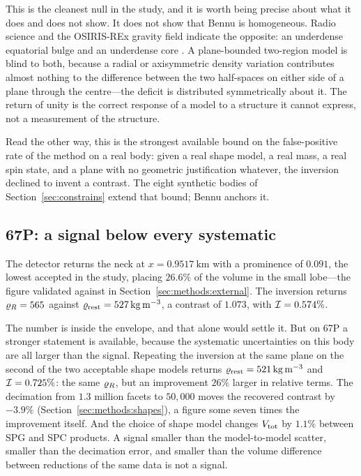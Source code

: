 This is the cleanest null in the study, and it is worth being precise
about what it does and does not show. It does not show that Bennu is
homogeneous. Radio science and the OSIRIS-REx gravity field indicate the
opposite: an underdense equatorial bulge and an underdense core
\citep{scheeres2020}. A plane-bounded two-region model is blind to both,
because a radial or axisymmetric density variation contributes almost
nothing to the difference between the two half-spaces on either side of a
plane through the centre---the deficit is distributed symmetrically about
it. The return of unity is the correct response of a model to a structure
it cannot express, not a measurement of the structure.

Read the other way, this is the strongest available bound on the
false-positive rate of the method on a real body: given a real shape
model, a real mass, a real spin state, and a plane with no geometric
justification whatever, the inversion declined to invent a contrast. The
eight synthetic bodies of Section~\ref{sec:constrains} extend that bound;
Bennu anchors it.

\subsection{67P: a signal below every systematic}
\label{sec:nulls:67p}

The detector returns the neck at $x = \SI{+0.9517}{\kilo\metre}$ with a
prominence of $0.091$, the lowest accepted in the study, placing $26.6\%$
of the volume in the small lobe---the figure validated against
\citet{jorda2016} in Section~\ref{sec:methods:external}. The inversion
returns $\varrho_{R} = 565$ against $\varrho_{\mathrm{rest}} = \SI{527}{\kilo\gram\per
\cubic\metre}$, a contrast of $1.073$, with $\mathcal{I} = 0.574\%$.

The number is inside the envelope, and that alone would settle it. But on
67P a stronger statement is available, because the systematic
uncertainties on this body are all larger than the signal. Repeating the
inversion at the same plane on the second of the two acceptable shape
models returns $\varrho_{\mathrm{rest}} = \SI{521}{\kilo\gram\per\cubic\metre}$ and
$\mathcal{I} = 0.725\%$: the same $\varrho_{R}$, but an improvement $26\%$ larger
in relative terms. The decimation from $1.3$ million facets to $50{,}000$
moves the recovered contrast by $-3.9\%$
(Section~\ref{sec:methods:shapes}), a figure some seven times the
improvement itself. And the choice of shape model changes $V_{\mathrm{tot}}$ by
$1.1\%$ between SPG and SPC products. A signal smaller than the
model-to-model scatter, smaller than the decimation error, and smaller
than the volume difference between reductions of the same data is not a
signal.

